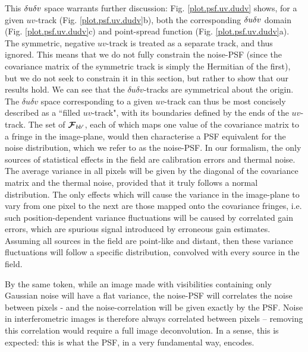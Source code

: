 \pg
This $\delta u\delta v$ space warrants further discussion: Fig. \ref{plot.psf.uv.dudv} shows, for a given $uv$-track (Fig. \ref{plot.psf.uv.dudv}b), both the corresponding $\delta u\delta v$ domain (Fig. \ref{plot.psf.uv.dudv}c) and point-spread function (Fig. \ref{plot.psf.uv.dudv}a). {The symmetric, negative $uv$-track is treated as a separate track, and thus ignored. This means that we do not fully constrain the noise-PSF (since the covariance matrix of the symmetric track is simply the Hermitian of the first), but we do not seek to constrain it in this section, but rather to show that our results hold.} We can see that the $\delta u \delta v$-tracks are symmetrical about the origin. The $\delta u \delta v$ space corresponding to a given $uv$-track can thus be most concisely described as a ``filled $uv$-track", with its boundaries defined by the ends of the $uv$-track. The set of $\bm{\mathcal{F}}_{bb'}$, each of which maps one value of the covariance matrix to a fringe in the image-plane, would then characterise a PSF equivalent for the noise distribution, which we refer to as the noise-PSF. In our formalism, the only sources of statistical effects in the field are calibration errors and thermal noise. The average variance in all pixels will be given by the diagonal of the covariance matrix and the thermal noise, provided that it truly follows a normal distribution. The only effects which will cause the variance in the image-plane to vary from one pixel to the next are those mapped onto the covariance fringes, i.e. such position-dependent variance fluctuations will be caused by correlated gain errors, which are spurious signal introduced by erroneous gain estimates. Assuming all sources in the field are point-like and distant, then these variance fluctuations will follow a specific distribution, convolved with every source in the field.

\pg
By the same token, while an image made with visibilities containing only Gaussian noise will have a flat variance, the noise-PSF will correlates the noise between pixels - and the noise-correlation will be given exactly by the PSF. Noise in interferometric images is therefore always correlated between pixels -- removing this correlation would require a full image deconvolution. In a sense, this is expected: this is what the PSF, in a very fundamental way, encodes.



